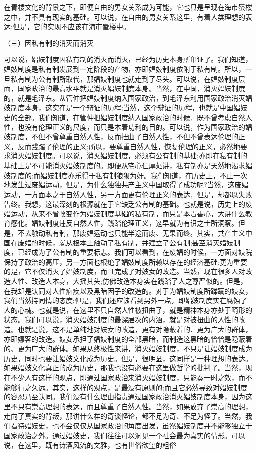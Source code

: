 \documentclass[a4paper]{article}
\begin{document}
在青楼文化的背景之下，即便自由的男女关系成为可能，它也只是呈现在海市蜃楼之中，并不具有现实的基础。可以说，在自由的男女关系这里，有着人类理想的表达;但是，它的实现不应该在海市蜃楼中。　　

（三）因私有制的消灭而消灭

可以说，娼妓制度因私有制的消灭而消灭，已经为历史本身所印证了。我们知道，娼妓制度是私有制发展到一定阶段的产物，亦即娼妓制度依附于私有制。所以，一旦私有制为公有制所取代，那娼妓制度也就走到了尽头。可以说，在娼妓制度层面，国家政治的最高水平就是消灭娼妓制度本身。当然，在中国，消灭娼妓制度的，就是毛泽东。从管仲把娼妓制度纳入国家政治，到毛泽东利用国家政治消灭娼妓制度本身，这实在是一个辩证的历程;当然，这个辩证的历程，也就是中国娼妓史的全部。我们知道，在管仲把娼妓制度纳入国家政治的时候，既不曾考虑自然人性，也没有伦理正义的尺度，而只是本着功利的目的。可以说，作为国家政治的娼妓制度，不但不曾尊重自然人性，反而扭曲了自然人性，不但不曾表达伦理的正义，反而践踏了伦理的正义;所以，要尊重自然人性，恢复伦理的正义，必然地要求消灭娼妓制度。可以说，消灭娼妓制度，必须有公有制的基础;亦即在私有制的基础上是不可能消灭娼妓制度的。即便从宅心仁厚处讲，私有制亦是天然地渴求娼妓制度的;而娼妓制度亦乐得于私有制狼狈为奸。我们知道，在历史上，不止一次地发生过废娼运动，但是，为什么独独共产主义中国取得了成功呢?当然，这废娼运动，一方面本之于自然人性，另一方面更有伦理正义的表达，但是，却都以失败告终。我想，这最深刻的根源就在于它缺乏公有制的基础。也就是说，历史上的废娼运动，从来不曾改变作为娼妓制度基础的私有制，而只是本着善心，大讲什么教育感化。娼妓制度违反自然人性，践踏伦理正义，这早就为有识之士所洞察。但是，不去触动私有制，那废娼运动也只能半途而废、无果而终。其实，共产主义中国在废娼的时候，就从根本上触动了私有制，并建立了公有制;甚至消灭娼妓制度，已经成为了公有制的重要标志。我们可以看到，在废娼的时候，一方面对妓院保持了政治的高压，另一方面也根绝了娼妓制度所赖以存在的经济基础;更为重要的是，它不仅消灭了娼妓制度，而且完成了对妓女的改造。当然，现在很多人对改造人性、改造人本身，大摇其头;仿佛改造本身实在践踏了人之尊严似的。但是，在我却是认同对人性痼疾以及黑暗因子的改造的。对于为娼妓制度所蹂躏的妓女，我们当然持同情的态度;但是，我们还应该看到另外一点，即娼妓制度实在腐蚀了人的心魂。也就是说，在这里不只自然人性被扭曲了，就是精神本身亦处于畸形的状态。我们可以说，消灭娼妓制度的最深层次的内涵，就是对被扭曲的人性的改造。也就是说，这不是单纯地对妓女的改造，更有对隐蔽着的、更为广大的群体，亦即嫖客的改造。妓女承担了娼妓制度的全部黑暗，而制造这黑暗的恰恰是隐蔽着的、更为广大的群体。如果从终极性来讲，消灭娼妓制度，不只是让娼妓制度成为历史，同时也要让娼妓文化成为历史。但是，很明显，这同样是一种理想的表达。如果娼妓文化真正的成为历史，那我也没有必要在这里做哲学的批判了。当然，现在不少人有这样的观点，即通过国家政治来消灭娼妓制度，只能奏一时之效，而不能够行之久远。其实，这样的观点，是最没有原则的;而且它必然导致对娼妓制度的容忍乃至认同。我们没有什么理由指责通过国家政治消灭娼妓制度本身，因为这里不只有崇高理想的表达，而且尊重了自然人性。当然，如果放弃了崇高的理想，走向了真实的背叛，那讲什么样的奇谈怪论，都不足为奇、不足为怪了。当然，我们看待娼妓史，也不会仅仅从国家政治的角度出发，虽然娼妓制度并不能够独立于国家政治之外。通过娼妓史，我们往往可以洞见一个社会最为真实的情形。可以说，在这里，既有诗酒风流的文雅，也有世俗欲望的粗俗
\end{document}
